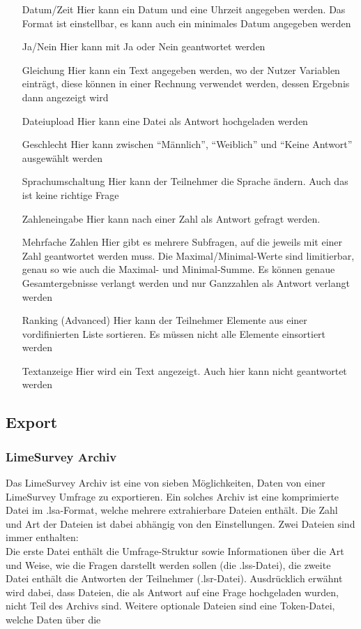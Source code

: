\begin{itemize}
	\item[Datum/Zeit] Hier kann ein Datum und eine Uhrzeit angegeben werden. Das Format ist einstellbar, es kann auch ein minimales Datum angegeben werden
	\item[Ja/Nein] Hier kann mit Ja oder Nein geantwortet werden
	\item[Gleichung] Hier kann ein Text angegeben werden, wo der Nutzer Variablen einträgt, diese können in einer Rechnung verwendet werden, dessen Ergebnis dann angezeigt wird
	\item[Dateiupload] Hier kann eine Datei als Antwort hochgeladen werden
	\item[Geschlecht] Hier kann zwischen \enquote{Männlich}, \enquote{Weiblich} und \enquote{Keine Antwort} ausgewählt werden
	\item[Sprachumschaltung] Hier kann der Teilnehmer die Sprache ändern. Auch das ist keine richtige Frage
	\item[Zahleneingabe] Hier kann nach einer Zahl als Antwort gefragt werden.
	\item[Mehrfache Zahlen] Hier gibt es mehrere Subfragen, auf die jeweils mit einer Zahl geantwortet werden muss. Die Maximal/Minimal-Werte sind limitierbar, genau so wie auch die Maximal- und Minimal-Summe. Es können genaue Gesamtergebnisse verlangt werden und nur Ganzzahlen als Antwort verlangt werden
	\item[Ranking (Advanced)] Hier kann der Teilnehmer Elemente aus einer vordifinierten Liste sortieren. Es müssen nicht alle Elemente einsortiert werden
	\item[Textanzeige] Hier wird ein Text angezeigt. Auch hier kann nicht geantwortet werden
\end{itemize}

\subsection{Export}
\subsubsection{LimeSurvey Archiv}
\label{m:lsa}
Das LimeSurvey Archiv ist eine von sieben Möglichkeiten, Daten von einer LimeSurvey Umfrage zu exportieren.
Ein solches Archiv ist eine komprimierte Datei im .lsa-Format, welche mehrere extrahierbare Dateien enthält.
Die Zahl und Art der Dateien ist dabei abhängig von den Einstellungen. Zwei Dateien sind immer enthalten:\\
Die erste Datei enthält die Umfrage-Struktur sowie Informationen über die Art und Weise, wie die Fragen darstellt werden sollen (die .lss-Datei), die zweite Datei enthält die Antworten der Teilnehmer (.lsr-Datei).
Ausdrücklich erwähnt wird dabei, dass Dateien, die als Antwort auf eine Frage hochgeladen wurden, nicht Teil des Archivs sind.
Weitere optionale Dateien sind eine Token-Datei, welche Daten über die %

